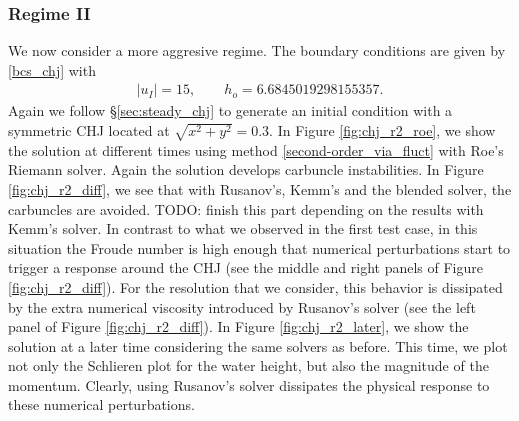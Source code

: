 \documentclass[preprint, 11pt]{article}
\newcommand{\bfu}{{u}}
\begin{document}
\subsubsection{Regime II}
We now consider a more aggresive regime. The boundary conditions are given by \eqref{bcs_chj} with 
\begin{align}\label{bcs_chj_r2}
  |\bfu_I|=15, \qquad h_o=6.6845019298155357.
\end{align}
Again we follow \S \ref{sec:steady_chj} to generate an initial condition with a symmetric CHJ located at
$\sqrt{x^2+y^2}=0.3$. In Figure \ref{fig:chj_r2_roe}, we show the solution at different times using method
\eqref{second-order_via_fluct} with Roe's Riemann solver. Again the solution develops
carbuncle instabilities.  In Figure \ref{fig:chj_r2_diff}, we 
see that with Rusanov's, Kemm's and the blended solver, the carbuncles are avoided.
{\color{red} TODO: finish this part depending on the results with Kemm's solver.}
%
In contrast to what we observed in the first test case, in this situation the Froude number is
high enough that numerical perturbations start to trigger a response around the CHJ
(see the middle and right panels of Figure \ref{fig:chj_r2_diff}).
For the resolution that we consider, this behavior is dissipated by the extra numerical viscosity introduced by
Rusanov's solver (see the left panel of Figure \ref{fig:chj_r2_diff}).
In Figure \ref{fig:chj_r2_later}, we show the solution at a later time considering the same solvers as before.
This time, we plot not only the Schlieren plot for the water height, but also the magnitude of the momentum. 
Clearly, using Rusanov's solver dissipates the physical response to these numerical perturbations. 
\end{document}
